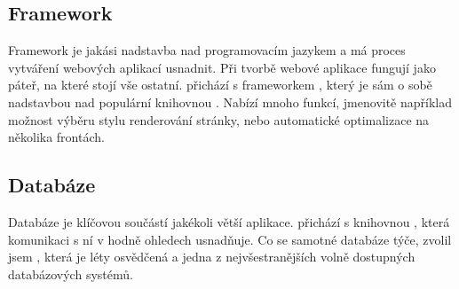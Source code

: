 \subsection{Framework}

Framework je jakási nadstavba nad programovacím jazykem a má proces vytváření webových aplikací usnadnit. Při tvorbě webové aplikace fungují jako páteř, na které stojí vše ostatní.  přichází s frameworkem , který je sám o sobě nadstavbou nad populární knihovnou . Nabízí mnoho funkcí, jmenovitě například možnost výběru stylu renderování stránky, nebo automatické optimalizace na několika frontách.

\subsection{Databáze}

Databáze je klíčovou součástí jakékoli větší aplikace.  přichází s knihovnou , která komunikaci s ní v hodně ohledech usnadňuje. Co se samotné databáze týče, zvolil jsem , která je léty osvědčená a jedna z nejvšestranějších volně dostupných databázových systémů.